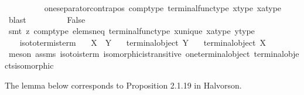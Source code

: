 \begin{isabellebody}
\ \ \ \ \ \ \ \ \isamarkupfalse%
\ one{\isacharunderscore}{\kern0pt}separator{\isacharunderscore}{\kern0pt}contrapos\ comp{\isacharunderscore}{\kern0pt}type\ terminal{\isacharunderscore}{\kern0pt}func{\isacharunderscore}{\kern0pt}type\ x{\isacharunderscore}{\kern0pt}type\ xa{\isacharunderscore}{\kern0pt}type\ \isamarkupfalse%
\ blast\isanewline
\ \ \ \ \ \ \isamarkupfalse%
\ \isamarkupfalse%
\ False\isanewline
\ \ \ \ \ \ \ \ \isamarkupfalse%
\ {\isacharparenleft}{\kern0pt}smt\ {\isacharparenleft}{\kern0pt}z{}{\isacharparenright}{\kern0pt}\ comp{\isacharunderscore}{\kern0pt}type\ elems{\isacharunderscore}{\kern0pt}neq\ terminal{\isacharunderscore}{\kern0pt}func{\isacharunderscore}{\kern0pt}type\ x{\isacharunderscore}{\kern0pt}unique\ xa{\isacharunderscore}{\kern0pt}type\ y{\isacharunderscore}{\kern0pt}type{\isacharparenright}{\kern0pt}\ \ \ \ \ \isanewline
\ \ \ \ \isamarkupfalse%
\isanewline
\ \ \isamarkupfalse%
\isanewline
{}\isamarkupfalse%
%
\endisatagproof
{\isafoldproof}%
%
\isadelimproof
\isanewline
%
\endisadelimproof
\isanewline
{}\isamarkupfalse%
\ iso{\isacharunderscore}{\kern0pt}to{\isacharunderscore}{\kern0pt}term{\isacharunderscore}{\kern0pt}is{\isacharunderscore}{\kern0pt}term{\isacharcolon}{\kern0pt}\isanewline
\ \ \ {\isachardoublequoteopen}X\ {\isasymcong}\ Y{\isachardoublequoteclose}\isanewline
\ \ \ {\isachardoublequoteopen}terminal{\isacharunderscore}{\kern0pt}object\ Y{\isachardoublequoteclose}\isanewline
\ \ \ {\isachardoublequoteopen}terminal{\isacharunderscore}{\kern0pt}object\ X{\isachardoublequoteclose}\isanewline
%
\isadelimproof
\ \ %
\endisadelimproof
%
\isatagproof
{}\isamarkupfalse%
\ {\isacharparenleft}{\kern0pt}meson\ assms\ iso{\isacharunderscore}{\kern0pt}to{}{\isacharunderscore}{\kern0pt}is{\isacharunderscore}{\kern0pt}term\ isomorphic{\isacharunderscore}{\kern0pt}is{\isacharunderscore}{\kern0pt}transitive\ one{\isacharunderscore}{\kern0pt}terminal{\isacharunderscore}{\kern0pt}object\ terminal{\isacharunderscore}{\kern0pt}objects{\isacharunderscore}{\kern0pt}isomorphic{\isacharparenright}{\kern0pt}%
\endisatagproof
{\isafoldproof}%
%
\isadelimproof
%
\endisadelimproof
%
\begin{isamarkuptext}%
The lemma below corresponds to Proposition 2.1.19 in Halvorson.%
\end{isamarkuptext}\isamarkuptrue%
\isamarkupfalse%

\end{isabellebody}
